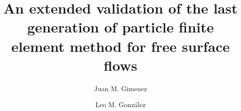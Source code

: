\documentclass[review]{elsarticle}
\begin{document}
\begin{frontmatter}

\title{An extended validation of the last generation of particle finite element method for free surface flows}


\author[mymainaddress]{Juan M. Gimenez}
\author[mysecondaryaddress]{Leo M. Gonz\'{a}lez}
\address[mymainaddress]{Centro de Investigaci\'on de M\'etodos Computacionales (CIMEC) - UNL/CONICET, Predio Conicet-Santa Fe Colectora Ruta Nac 168
	      Paraje El Pozo, Santa Fe, Argentina.}
\address[mysecondaryaddress]{Escuela T\'{e}cnica Superior de Ingenieros Navales, Universidad Polit\'{e}cnica de Madrid (ETSIN-UPM), Avd. Arco de la Victoria 4, Madrid, Spain}


\end{frontmatter}
\end{document}
